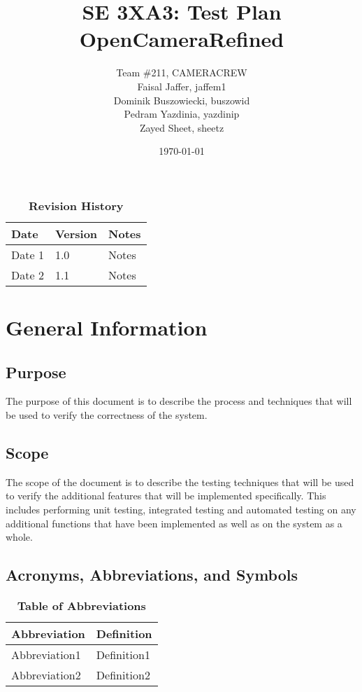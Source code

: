 \documentclass[12pt, titlepage]{article}
\title{SE 3XA3: Test Plan\\OpenCameraRefined}
\author{Team \#211, CAMERACREW
		\\ Faisal Jaffer, jaffem1
		\\ Dominik Buszowiecki, buszowid
		\\ Pedram Yazdinia, yazdinip
		\\ Zayed Sheet, sheetz
}
\date{\today}
\begin{document}
\maketitle

\tableofcontents
\listoftables
\listoffigures

\begin{table}[bp]
\caption{\bf Revision History}
\begin{tabularx}{\textwidth}{p{3cm}p{2cm}X}
\toprule {\bf Date} & {\bf Version} & {\bf Notes}\\
\midrule
Date 1 & 1.0 & Notes\\
Date 2 & 1.1 & Notes\\
\bottomrule
\end{tabularx}
\end{table}

\newpage


\section{General Information}

\subsection{Purpose}
    The purpose of this document is to describe the process and techniques that will be used to verify the correctness of the system.

\subsection{Scope}
    The scope of the document is to describe the testing techniques that will be used to verify the additional features that will be implemented specifically. This includes performing unit testing, integrated testing and automated testing on any additional functions that have been implemented as well as on the system as a whole.

\subsection{Acronyms, Abbreviations, and Symbols}
	
\begin{table}[hbp]
\caption{\textbf{Table of Abbreviations}} \label{Table}

\begin{tabularx}{\textwidth}{p{3cm}X}
\toprule
\textbf{Abbreviation} & \textbf{Definition} \\
\midrule
Abbreviation1 & Definition1\\
Abbreviation2 & Definition2\\
\bottomrule
\end{tabularx}

\end{table}
\end{document}
